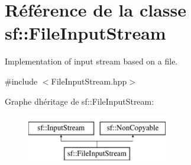 \hypertarget{classsf_1_1FileInputStream}{}\section{Référence de la classe sf\+:\+:File\+Input\+Stream}
\label{classsf_1_1FileInputStream}


Implementation of input stream based on a file.  




{\ttfamily \#include $<$File\+Input\+Stream.\+hpp$>$}

Graphe d\textquotesingle{}héritage de sf\+:\+:File\+Input\+Stream\+:\begin{figure}[H]
\begin{center}
\leavevmode
\includegraphics[height=2.000000cm]{classsf_1_1FileInputStream}
\end{center}
\end{figure}
